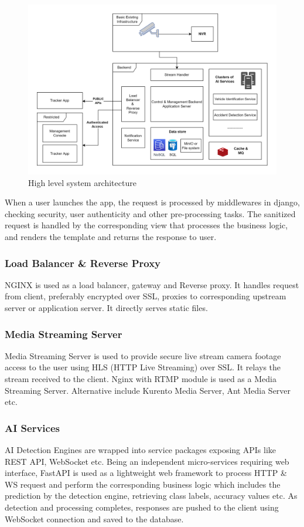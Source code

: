 \begin{figure}[!ht]
	\centering
	\includegraphics[width=0.8\linewidth]{Images/architecture_high_level}
	\caption{High level system architecture}
	\label{fig:architecturehighlevel}
\end{figure}

When a user launches the app, the request is processed by middlewares in django, checking security, user authenticity and other pre-processing tasks. The sanitized request is handled by the corresponding view that processes the business logic, and renders the template and returns the response to user.

\subsubsection{Load Balancer \& Reverse Proxy}
NGINX is used as a load balancer, gateway and Reverse proxy. It handles request from client, preferably encrypted over SSL, proxies to corresponding upstream server or application server. It directly serves static files.

\subsubsection{Media Streaming Server}
Media Streaming Server is used to provide secure live stream camera footage access to the user using HLS (HTTP Live Streaming) over SSL. It relays the stream received to the client. Nginx with RTMP module is used as a Media Streaming Server. Alternative include Kurento Media Server, Ant Media Server etc.

\subsubsection{AI Services}
AI Detection Engines are wrapped into service packages exposing APIs like REST API, WebSocket etc. Being an independent micro-services requiring web interface, FastAPI is used as a lightweight web framework to process HTTP \& WS request and perform the corresponding business logic which includes the prediction by the detection engine, retrieving class labels, accuracy values etc. As detection and processing completes, responses are pushed to the client using WebSocket connection and saved to the database.

